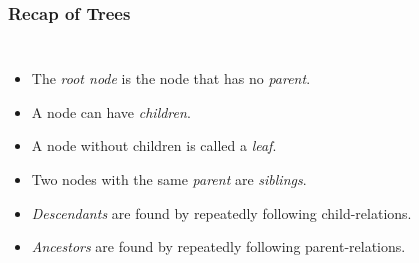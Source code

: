 \begin{frame}
	\frametitle{Recap of Trees}
	\begin{columns}
		\begin{itemize}
			\item The \textit{root node} is the node that has no \textit{parent}.
			\item A node can have \textit{children}.
			\item A node without children is called a \textit{leaf}.
			\item Two nodes with the same \textit{parent} are \textit{siblings}.
			\item \textit{Descendants} are found by repeatedly following child-relations.
			\item \textit{Ancestors} are found by repeatedly following parent-relations.
		\end{itemize}
	\end{columns}
\end{frame}


